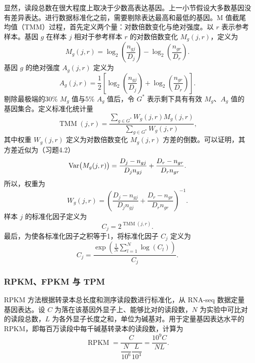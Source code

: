 显然，读段总数在很大程度上取决于少数高表达基因。上一小节假设大多数基因没有差异表达。进行数据标准化之前，需要剔除表达最高和最低的基因。M 值截尾均值（TMM）过程，首先定义两个量：对数倍数变化与绝对强度。以 $r$ 表示参考样本。基因 $g$ 在样本 $j$ 相对于参考样本 $r$ 的对数倍数变化 $M_g(j,r)$，定义为
\begin{equation}
M_g(j,r)=\log_2\left(\frac{n_{gj}}{D_j}\right)-\log_2\left(\frac{n_{gr}}{D_r}\right).
\tag{4.11}
\end{equation}
基因 $g$ 的绝对强度 $A_g(j,r)$ 定义为
\begin{equation}
A_g(j,r)=\frac12\left[\log_2\left(\frac{n_{gj}}{D_j}\right)+\log_2\left(\frac{n_{gr}}{D_r}\right)\right].
\tag{4.12}
\end{equation}
剔除最极端的30\% $M_g$ 值与5\% $A_g$ 值后，令 $G^*$ 表示剩下具有有效 $M_g$、$A_g$ 值的基因集合。定义标准化统计量
\begin{equation}
\operatorname{TMM}(j,r)=\frac{\sum_{g\in G^*}W_g(j,r)M_g(j,r)}{\sum_{g\in G^*}W_g(j,r)},
\tag{4.13}
\end{equation}
其中权重 $W_g(j,r)$ 定义为对数倍数变化 $M_g(j,r)$ 方差的倒数。可以证明，其方差近似为（习题4.2）
\[
\operatorname{Var}\bigl(M_g(j,r)\bigr)=\frac{D_j-n_{gj}}{D_jn_{gj}}+\frac{D_r-n_{gr}}{D_rn_{gr}}.
\]
所以，权重为
\begin{equation}
W_g(j,r)=\left(\frac{D_j-n_{gj}}{D_jn_{gj}}+\frac{D_r-n_{gr}}{D_rn_{gr}}\right)^{-1}.
\tag{4.14}
\end{equation}
样本 $j$ 的标准化因子定义为
\begin{equation}
C_j=2^{\operatorname{TMM}(j,r)}.
\tag{4.15}
\end{equation}
最后，为使各标准化因子之积等于1，将标准化因子 $C_j$ 定义为
\begin{equation}
C_j=\frac{\exp\left(\frac1N\sum_{l=1}^{N}\log(C_l)\right)}{C_j}.
\tag{4.16}
\end{equation}

\subsubsection{RPKM、FPKM 与 TPM}

RPKM 方法根据转录本总长度和测序读段数进行标准化，从 RNA-seq 数据定量基因表达。设 $C$ 为落在该基因外显子上、能够比对的读段数，$N$ 为实验中可比对的读段总数，$L$ 为各外显子长度之和，单位为碱基对。用于定量基因表达水平的 RPKM，即每百万读段中每千碱基转录本的读段数，计算为
\begin{equation}
\operatorname{RPKM}=\frac{C}{\dfrac{N}{10^6}\dfrac{L}{10^3}}=\frac{10^9C}{NL}.
\tag{4.17}
\end{equation}

